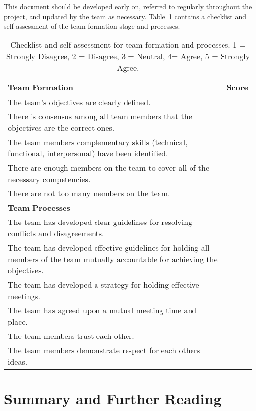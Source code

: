 This document should be developed early on, referred to regularly
throughout the project, and updated by the team as necessary. 
Table~\ref{table:teamCheckList}
contains a checklist and self-assessment of the team formation stage and
processes.

\begin{table}[h]
\small
\caption{Checklist and self-assessment for team formation and
processes. 1 = Strongly Disagree, 2 = Disagree, 3 = Neutral, 4= Agree, 5
= Strongly Agree.}
\label{table:teamCheckList}
\begin{tabular}{|m{12.5cm}|l|}
\hline
\rowcolor{Gray}
\textbf{Team Formation} & \textbf{Score} \\ \hline
The team's objectives are clearly defined. & \\ \hline
There is consensus among all team members that the objectives are the
correct ones. & \\ \hline
The team members complementary skills (technical, functional,
interpersonal) have been identified. & \\ \hline
There are enough members on the team to cover all of the necessary
competencies. & \\ \hline
There are not too many members on the team. & \\ \hline
\rowcolor{Gray}
\textbf{Team Processes} & \\ \hline
The team has developed clear guidelines for resolving conflicts and
disagreements. & \\ \hline
The team has developed effective guidelines for holding all members of
the team mutually accountable for achieving the objectives. & \\ \hline
The team has developed a strategy for holding effective meetings. & \\ \hline
The team has agreed upon a mutual meeting time and place. & \\ \hline
The team members trust each other. & \\ \hline
The team members demonstrate respect for each others ideas. & \\ \hline
\end{tabular}
\end{table}


\section{Summary and Further Reading}
\label{section:teamsSummary-and-further-reading}


